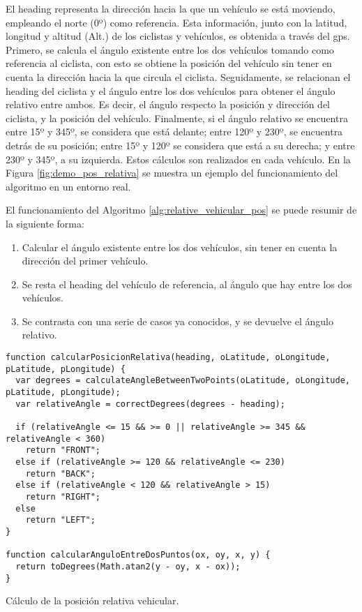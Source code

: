 El heading representa la dirección hacia la que un vehículo se está moviendo,
empleando el norte (0º) como referencia. Esta información, junto con la
latitud, longitud y altitud (Alt.) de los ciclistas y vehículos, es obtenida a
través del \gls{gps}. Primero, se calcula el ángulo existente entre los dos
vehículos tomando como referencia al ciclista, con esto se obtiene la posición
del vehículo sin tener en cuenta la dirección hacia la que circula el ciclista.
Seguidamente, se relacionan el heading del ciclista y el ángulo entre los dos
vehículos para obtener el ángulo relativo entre ambos. Es decir, el ángulo
respecto la posición y dirección del ciclista, y la posición del vehículo.
Finalmente, si el ángulo relativo se encuentra entre 15º y 345º, se considera
que está delante; entre 120º y 230º, se encuentra detrás de su posición; entre
15º y 120º se considera que está a su derecha; y entre 230º y 345º, a su
izquierda. Estos cálculos son realizados en cada vehículo. En la Figura
\ref{fig:demo_pos_relativa} se muestra un ejemplo del funcionamiento del
algoritmo en un entorno real.

El funcionamiento del Algoritmo \ref{alg:relative_vehicular_pos} se puede
resumir de la siguiente forma:
\begin{enumerate}
	\item Calcular el ángulo existente entre los dos vehículos, sin tener en
	cuenta la dirección del primer vehículo.

	\item Se resta el heading del vehículo de referencia, al ángulo que hay entre
	los dos vehículos.

	\item Se contrasta con una serie de casos ya conocidos, y se devuelve el
	ángulo relativo.
\end{enumerate}

\begin{listing}
	\begin{minipage}{.4\textwidth}
		\begin{verbatim}
function calcularPosicionRelativa(heading, oLatitude, oLongitude, pLatitude, pLongitude) {
  var degrees = calculateAngleBetweenTwoPoints(oLatitude, oLongitude, pLatitude, pLongitude);
  var relativeAngle = correctDegrees(degrees - heading);

  if (relativeAngle <= 15 && >= 0 || relativeAngle >= 345 && relativeAngle < 360)
    return "FRONT";
  else if (relativeAngle >= 120 && relativeAngle <= 230)
    return "BACK";
  else if (relativeAngle < 120 && relativeAngle > 15)
    return "RIGHT";
  else
    return "LEFT";
}

function calcularAnguloEntreDosPuntos(ox, oy, x, y) {
  return toDegrees(Math.atan2(y - oy, x - ox));
}
\end{verbatim}
\end{minipage}
\caption{Cálculo de la posición relativa vehicular.}
\label{alg:relative_vehicular_pos}
\end{listing}

